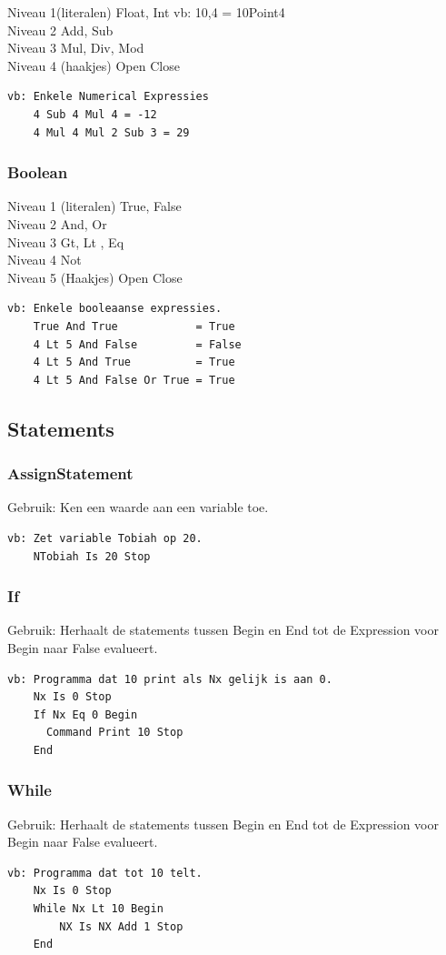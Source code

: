 \documentclass[a4paper,10pt]{article}
\begin{document}
    Niveau 1(literalen)  
    Float, Int
    vb: 10,4 = 10Point4\\
    Niveau 2  
    Add, Sub\\
    Niveau 3  
    Mul, Div, Mod\\
    Niveau 4 (haakjes)  
    Open Close  
     \begin{lstlisting}[language=Alphi]
vb: Enkele Numerical Expressies
    4 Sub 4 Mul 4 = -12      
    4 Mul 4 Mul 2 Sub 3 = 29
     \end{lstlisting}
    \subsubsection{Boolean}
    
    Niveau 1 (literalen)
    True, False\\
    Niveau 2
    And, Or\\
    Niveau 3
    Gt, Lt , Eq\\
    Niveau 4
    Not\\
    Niveau 5 (Haakjes)
    Open Close
      \begin{lstlisting}[language=Alphi]
vb: Enkele booleaanse expressies.
    True And True            = True
    4 Lt 5 And False         = False
    4 Lt 5 And True          = True
    4 Lt 5 And False Or True = True
      \end{lstlisting}
  \subsection{Statements}
    \subsubsection{AssignStatement}
    Gebruik: Ken een waarde aan een variable toe.
      \begin{lstlisting}[language=Alphi]
vb: Zet variable Tobiah op 20.
    NTobiah Is 20 Stop
      \end{lstlisting}
    \subsubsection{If}
    Gebruik: Herhaalt de statements tussen Begin en End tot de Expression voor Begin naar False evalueert.
      \begin{lstlisting}[language=Alphi]
vb: Programma dat 10 print als Nx gelijk is aan 0.
    Nx Is 0 Stop
    If Nx Eq 0 Begin
      Command Print 10 Stop
    End
      \end{lstlisting}
    \subsubsection{While}
    Gebruik: Herhaalt de statements tussen Begin en End tot de Expression voor Begin naar False evalueert.
      \begin{lstlisting}[language=Alphi]
vb: Programma dat tot 10 telt.
    Nx Is 0 Stop
    While Nx Lt 10 Begin
        NX Is NX Add 1 Stop
    End
      \end{lstlisting}
\end{document}
